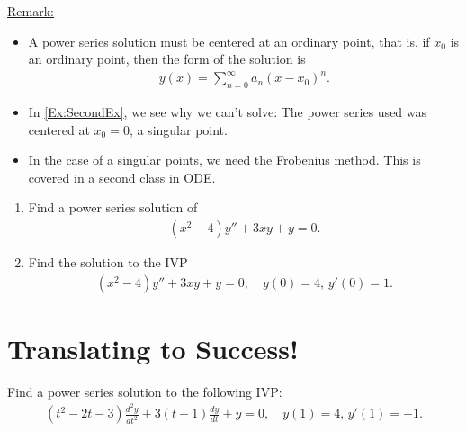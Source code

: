 \documentclass[12pt,a4paper]{article}
\newcounter{example}[section]
\begin{document}
\vfill

\underline{Remark:}
	\begin{itemize}
	\item A power series solution must be centered at an ordinary point, that is, if $x_0$ is an ordinary point, then the form of the solution is
		\begin{align*}
		y(x) = \sum_{n = 0}^\infty a_n (x - x_0)^n .
		\end{align*}
	\item In \cref{Ex:SecondEx}, we see why we can't solve: The power series used was centered at $x_0 = 0$, a singular point.
	\item In the case of a singular points, we need the Frobenius method. This is covered in a second class in ODE.
	\end{itemize}
	
	\newpage
	
	\begin{example}
	\begin{enumerate}[label=\textbf{(\alph*)}]
	\item Find a power series solution of
		\begin{align*}
		(x^2 - 4) y'' + 3xy + y = 0 .
		\end{align*}
	\item Find the solution to the IVP
		\begin{align*}
		(x^2 - 4)y'' + 3xy + y = 0 , \quad y(0) = 4 , \, y'(0) = 1 . 
		\end{align*}
	\end{enumerate}
	\end{example}
	
	\newpage
	
	\phantom{2}
	
	\newpage
	
	\phantom{2}
	
	\newpage
	
	\section{Translating to Success!}
	
	\begin{example}\label{Ex:TranslationExample}
	Find a power series solution to the following IVP:
		\begin{align*}
		(t^2 - 2t - 3) \frac{d^2 y}{dt^2} + 3 (t - 1) \frac{dy}{dt} + y = 0, \quad y(1) = 4 , \, y'(1) = -1 .
		\end{align*}
	\end{example}
	
\end{document}
